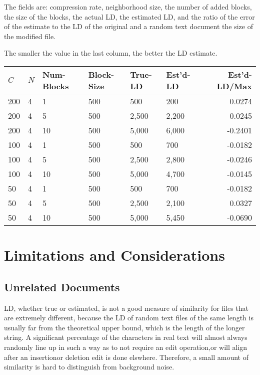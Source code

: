 \documentclass[html]{article}    %
\begin{document}
The fields are: compression rate, neighborhood size, the number of added blocks, 
the size of the blocks, the actual LD, the estimated LD, 
and the ratio of the error of the estimate to the LD of the original and a  
random text document the size of the modified file.

The smaller the value in the last column, the better the LD estimate.

\vspace {10 mm}
\begin {tabular} {|l|l|l|l|l|l|r|} \hline \hline
 $C$ 	& $N$ & Num-Blocks& Block-Size & True-LD	& Est'd-LD & Est'd-LD/Max \\
 \hline \hline
 
 200 	& 4  & 1 	& 500		& 500  		& 200 		& 	0.0274	\\ \hline
 200 	& 4  & 5 	& 500		& 2,500 	& 2,200 	&	0.0245	\\ \hline
 200 	& 4  & 10 	& 500		& 5,000  	& 6,000 	&	-0.2401	\\ \hline
 
 100 	& 4  & 1 	& 500		& 500  		& 700 		&	-0.0182	\\ \hline
 100 	& 4  & 5  	& 500		& 2,500		& 2,800 	&	-0.0246	\\ \hline
 100 	& 4  & 10 	& 500		& 5,000  	& 4,700   	&	-0.0145	\\ \hline
 
 50 	& 4  & 1	& 500		& 500  		& 700 		&	-0.0182	\\ \hline
 50 	& 4  & 5	& 500 		& 2,500  	& 2,100 	&	0.0327	\\ \hline
 50 	& 4  & 10 	& 500		& 5,000  	& 5,450 	&	-0.0690	\\ \hline
 
\end {tabular} 


\section{Limitations and Considerations}

\subsection{Unrelated Documents}

LD, whether true or estimated, is not a good measure of similarity for files 
that are extremely different, because the LD of random text files of the same 
length is usually far from the theoretical upper bound, which is the length of the 
longer string. 
A significant percentage of the characters in real text will almost always
randomly line up in such a way as to not require an edit operation,or will
align after an insertionor deletion edit is done elswhere. 
Therefore, a small amount of similarity is hard to distinguish from 
background noise.
\end{document}
